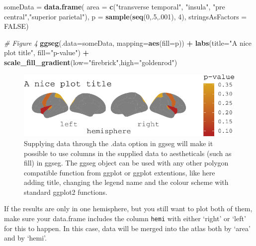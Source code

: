 \documentclass[fleqn,10pt]{wlpeerj} %
\newenvironment{Shaded}{\begin{snugshade}}{\end{snugshade}}
\newcommand{\CommentTok}[1]{\textcolor[rgb]{0.56,0.35,0.01}{\textit{#1}}}
\newcommand{\DataTypeTok}[1]{\textcolor[rgb]{0.13,0.29,0.53}{#1}}
\newcommand{\DecValTok}[1]{\textcolor[rgb]{0.00,0.00,0.81}{#1}}
\newcommand{\KeywordTok}[1]{\textcolor[rgb]{0.13,0.29,0.53}{\textbf{#1}}}
\newcommand{\NormalTok}[1]{#1}
\newcommand{\OperatorTok}[1]{\textcolor[rgb]{0.81,0.36,0.00}{\textbf{#1}}}
\newcommand{\OtherTok}[1]{\textcolor[rgb]{0.56,0.35,0.01}{#1}}
\newcommand{\StringTok}[1]{\textcolor[rgb]{0.31,0.60,0.02}{#1}}
\begin{document}
\begin{Shaded}
\begin{Highlighting}[]
\NormalTok{someData =}\StringTok{ }\KeywordTok{data.frame}\NormalTok{(}
  \DataTypeTok{area =} \KeywordTok{c}\NormalTok{(}\StringTok{"transverse temporal"}\NormalTok{, }\StringTok{"insula"}\NormalTok{,}
           \StringTok{"pre central"}\NormalTok{,}\StringTok{"superior parietal"}\NormalTok{),}
  \DataTypeTok{p =} \KeywordTok{sample}\NormalTok{(}\KeywordTok{seq}\NormalTok{(}\DecValTok{0}\NormalTok{,.}\DecValTok{5}\NormalTok{,.}\DecValTok{001}\NormalTok{), }\DecValTok{4}\NormalTok{),}
  \DataTypeTok{stringsAsFactors =} \OtherTok{FALSE}\NormalTok{)}

\CommentTok{# Figure 4}
\KeywordTok{ggseg}\NormalTok{(}\DataTypeTok{.data=}\NormalTok{someData, }\DataTypeTok{mapping=}\KeywordTok{aes}\NormalTok{(}\DataTypeTok{fill=}\NormalTok{p))  }\OperatorTok{+}
\StringTok{  }\KeywordTok{labs}\NormalTok{(}\DataTypeTok{title=}\StringTok{"A nice plot title"}\NormalTok{, }\DataTypeTok{fill=}\StringTok{"p-value"}\NormalTok{) }\OperatorTok{+}
\StringTok{  }\KeywordTok{scale_fill_gradient}\NormalTok{(}\DataTypeTok{low=}\StringTok{"firebrick"}\NormalTok{,}\DataTypeTok{high=}\StringTok{"goldenrod"}\NormalTok{)}
\end{Highlighting}
\end{Shaded}

\begin{figure}
\centering
\includegraphics{draft_2_files/figure-latex/datasupp-1.pdf}
\caption{\label{fig:datasupp}Supplying data through the .data option in ggseg will make it possible to use columns in the supplied data to aestheticals (such as fill) in ggseg. The ggseg object can be used with any other polygon compatible function from ggplot or ggplot extentions, like here adding title, changing the legend name and the colour scheme with standard ggplot2 functions.}
\end{figure}

If the results are only in one hemisphere, but you still want to plot both of them, make sure your data.frame includes the column \texttt{hemi} with either `right' or `left' for this to happen.
In this case, data will be merged into the atlas both by `area' and by `hemi'.
\end{document}

